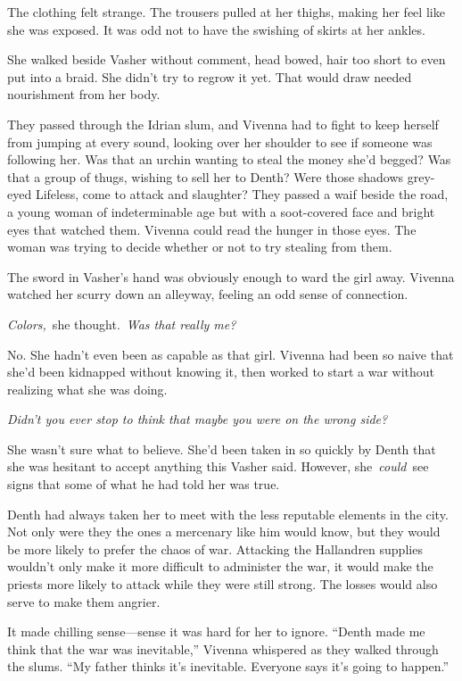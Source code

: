 The clothing felt strange. The trousers pulled at her thighs, making her feel like she was exposed. It was odd not to have the swishing of skirts at her ankles.

She walked beside Vasher without comment, head bowed, hair too short to even put into a braid. She didn’t try to regrow it yet. That would draw needed nourishment from her body.

They passed through the Idrian slum, and Vivenna had to fight to keep herself from jumping at every sound, looking over her shoulder to see if someone was following her. Was that an urchin wanting to steal the money she’d begged? Was that a group of thugs, wishing to sell her to Denth? Were those shadows grey-eyed Lifeless, come to attack and slaughter? They passed a waif beside the road, a young woman of indeterminable age but with a soot-covered face and bright eyes that watched them. Vivenna could read the hunger in those eyes. The woman was trying to decide whether or not to try stealing from them.

The sword in Vasher’s hand was obviously enough to ward the girl away. Vivenna watched her scurry down an alleyway, feeling an odd sense of connection.

\textit{Colors,}~she thought.~\textit{Was that really me?}

No. She hadn’t even been as capable as that girl. Vivenna had been so naive that she’d been kidnapped without knowing it, then worked to start a war without realizing what she was doing.

\textit{Didn’t you ever stop to think that maybe you were on the wrong side?}

She wasn’t sure what to believe. She’d been taken in so quickly by Denth that she was hesitant to accept anything this Vasher said. However, she~\textit{could}~see signs that some of what he had told her was true.

Denth had always taken her to meet with the less reputable elements in the city. Not only were they the ones a mercenary like him would know, but they would be more likely to prefer the chaos of war. Attacking the Hallandren supplies wouldn’t only make it more difficult to administer the war, it would make the priests more likely to attack while they were still strong. The losses would also serve to make them angrier.

It made chilling sense—sense it was hard for her to ignore. “Denth made me think that the war was inevitable,” Vivenna whispered as they walked through the slums. “My father thinks it’s inevitable. Everyone says it’s going to happen.”

